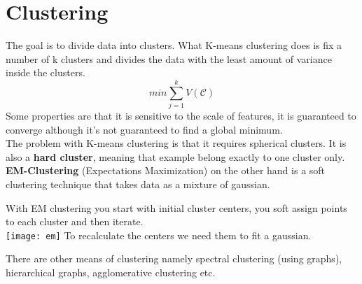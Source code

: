 \section{Clustering}
The goal is to divide data into clusters. What K-means clustering does is fix a number of k clusters and divides the data with the least amount of variance inside the clusters.
\[
min \sum_{j=1}^{k}V(\mathscr{C})
\]
Some properties are that it is sensitive to the scale of features, it is guaranteed to converge although it's not guaranteed to find a global minimum. \\
The problem with K-means clustering is that it requires spherical clusters. It is also a {\bf hard cluster}, meaning that example belong exactly to one cluster only. \\
{\bf EM-Clustering } (Expectations Maximization) on the other hand is a soft clustering technique that takes data as a mixture of gaussian.

With EM clustering you start with initial cluster centers, you soft assign points to each cluster and then iterate.\\
\texttt{[image: em]}
To recalculate the centers we need them to fit a gaussian.

There are other means of clustering namely spectral clustering (using graphs), hierarchical graphs, agglomerative clustering etc.